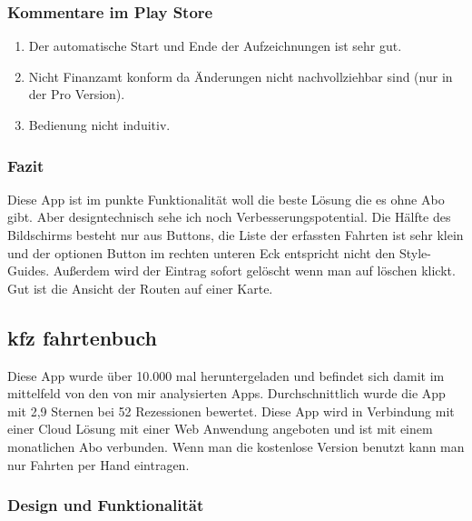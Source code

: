\documentclass[a4paper]{article}
\begin{document}
\subsubsection{Kommentare im Play Store}
\begin{enumerate}
    \item Der automatische Start und Ende der Aufzeichnungen ist sehr gut.
    \item Nicht Finanzamt konform da Änderungen nicht nachvollziehbar sind (nur in der Pro Version).
    \item Bedienung nicht induitiv.
\end{enumerate}

\subsubsection{Fazit}
Diese App ist im punkte Funktionalität woll die beste Lösung die es ohne Abo gibt. Aber designtechnisch
sehe ich noch Verbesserungspotential. Die Hälfte des Bildschirms besteht nur aus Buttons, die Liste
der erfassten Fahrten ist sehr klein und der optionen Button im rechten unteren Eck entspricht nicht
den Style-Guides. Außerdem wird der Eintrag sofort gelöscht wenn man auf löschen klickt. Gut ist die
Ansicht der Routen auf einer Karte.

\subsection{kfz fahrtenbuch}
Diese App wurde über 10.000 mal heruntergeladen und befindet sich damit im mittelfeld von den von mir
analysierten Apps. Durchschnittlich wurde die App mit 2,9 Sternen bei 52 Rezessionen bewertet.
Diese App wird in Verbindung mit einer Cloud Lösung mit einer Web Anwendung angeboten und ist mit einem
monatlichen Abo verbunden. Wenn man die kostenlose Version benutzt kann man nur Fahrten per Hand eintragen.

\subsubsection{Design und Funktionalität}
\end{document}
